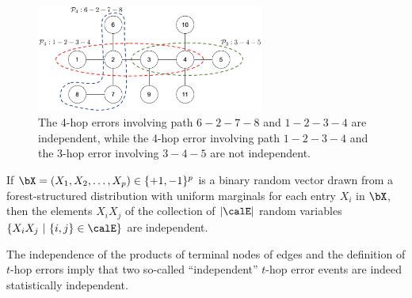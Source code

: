 \documentclass[11pt,onecolumn]{article}
\begin{document}
\begin{figure}[t]
	\centering
	\includegraphics[width=0.665\textwidth]{indep_err.eps}
	\caption{\small The 4-hop errors involving path $6-2-7-8$ and $1-2-3-4$ are independent, while the 4-hop error involving path $1-2-3-4$ and the 3-hop error involving $3-4-5$ are not independent.}
	\label{fig:indeperr}
\end{figure}
\begin{lemma}\label{lem:indeppair}
	If $\bX=(X_1, X_2, \ldots, X_p) \in \{+1,-1\}^{p}$ is a  binary random vector    drawn from a forest-structured distribution with uniform marginals for each entry $X_{i}$ in $\bX$, then the elements  $X_iX_j$
	of the collection of $|\calE|$ random variables $\{X_{i}X_{j}~|~\{i,j\}\in\calE\}$ are independent.
\end{lemma}
The independence of the products of terminal nodes of edges and the definition of $t$-hop errors imply that two so-called ``independent'' $t$-hop error events are indeed statistically independent. 
\end{document}
